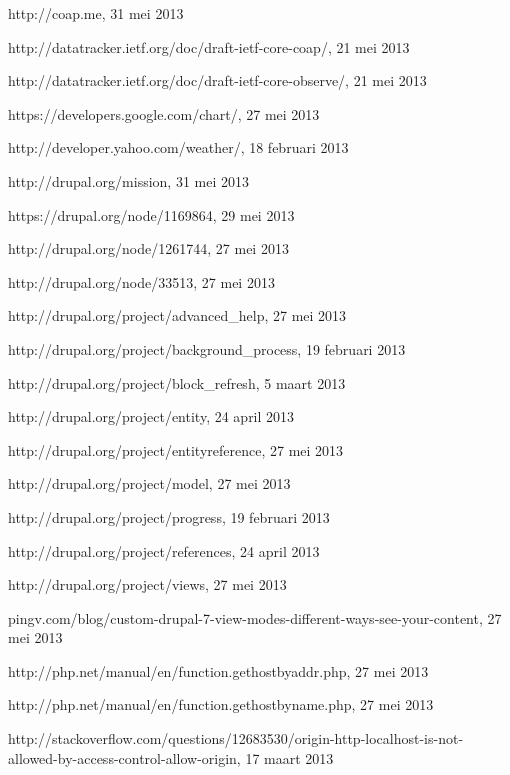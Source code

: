 \begin{thebibliography}{99}
 http://coap.me, 31 mei 2013

 http://datatracker.ietf.org/doc/draft-ietf-core-coap/, 21 mei 2013

 http://datatracker.ietf.org/doc/draft-ietf-core-observe/, 21 mei 2013

 https://developers.google.com/chart/, 27 mei 2013

 http://developer.yahoo.com/weather/, 18 februari 2013

 http://drupal.org/mission, 31 mei 2013

 https://drupal.org/node/1169864, 29 mei 2013

 http://drupal.org/node/1261744, 27 mei 2013

 http://drupal.org/node/33513, 27 mei 2013

 http://drupal.org/project/advanced\_help, 27 mei 2013

 http://drupal.org/project/background\_process, 19 februari 2013

 http://drupal.org/project/block\_refresh, 5 maart 2013

 http://drupal.org/project/entity, 24 april 2013

 http://drupal.org/project/entityreference, 27 mei 2013

 http://drupal.org/project/model, 27 mei 2013

 http://drupal.org/project/progress, 19 februari 2013

 http://drupal.org/project/references, 24 april 2013

 http://drupal.org/project/views, 27 mei 2013

 pingv.com/blog/custom-drupal-7-view-modes-different-ways-see-your-content, 27 mei 2013

 http://php.net/manual/en/function.gethostbyaddr.php, 27 mei 2013

 http://php.net/manual/en/function.gethostbyname.php, 27 mei 2013

 http://stackoverflow.com/questions/12683530/origin-http-localhost-is-not-allowed-by-access-control-allow-origin, 17 maart 2013


\end{thebibliography}
